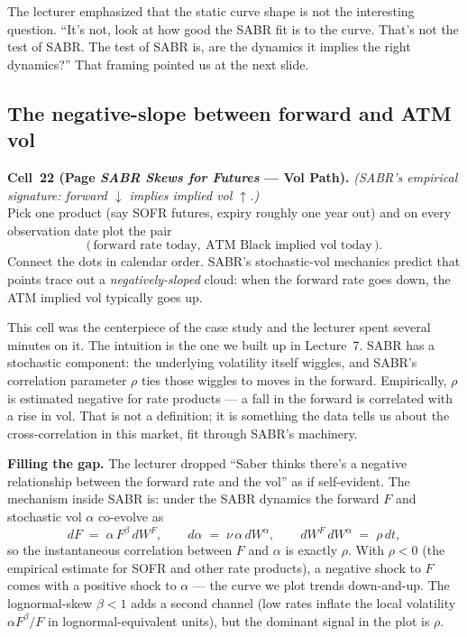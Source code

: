 The lecturer emphasized that the static curve shape is not the
interesting question. ``It's not, look at how good the SABR fit is
to the curve. That's not the test of SABR. The test of SABR is, are
the dynamics it implies the right dynamics?'' That framing pointed
us at the next slide.

\subsection{The negative-slope between forward and ATM vol}\label{L8-sec:negslope}

\begin{keyblock}
\textbf{Cell~22 (Page \emph{SABR Skews for Futures} --- Vol Path).}
\emph{(SABR's empirical signature: forward $\downarrow$ implies
implied vol $\uparrow$.)}\\
Pick one product (say SOFR futures, expiry roughly one year out) and
on every observation date plot the pair
\[
   \bigl(\,\text{forward rate today},\ \text{ATM Black implied vol today}\,\bigr).
\]
Connect the dots in calendar order. SABR's stochastic-vol mechanics
predict that points trace out a \emph{negatively-sloped} cloud:
when the forward rate goes down, the ATM implied vol typically goes
up.
\end{keyblock}

This cell was the centerpiece of the case study and the lecturer
spent several minutes on it. The intuition is the one we built up
in Lecture~7. SABR has a stochastic component: the underlying
volatility itself wiggles, and SABR's correlation parameter $\rho$
ties those wiggles to moves in the forward. Empirically, $\rho$ is
estimated negative for rate products --- a fall in the forward is
correlated with a rise in vol. That is not a definition; it is
something the data tells us about the cross-correlation in this
market, fit through SABR's machinery.

\begin{tipblock}
\textbf{Filling the gap.} The lecturer dropped ``Saber thinks there's
a negative relationship between the forward rate and the vol'' as if
self-evident. The mechanism inside SABR is: under the SABR dynamics
the forward $F$ and stochastic vol $\alpha$ co-evolve as
\[
  dF \;=\; \alpha\,F^{\beta}\,dW^{F},
  \qquad
  d\alpha \;=\; \nu\,\alpha\,dW^{\alpha},
  \qquad
  dW^{F}\,dW^{\alpha} \;=\; \rho\,dt,
\]
so the instantaneous correlation between $F$ and $\alpha$ is exactly
$\rho$. With $\rho < 0$ (the empirical estimate for SOFR and other
rate products), a negative shock to $F$ comes with a positive shock
to $\alpha$ --- the curve we plot trends down-and-up. The
lognormal-skew $\beta < 1$ adds a second channel (low rates inflate
the local volatility $\alpha F^{\beta}/F$ in lognormal-equivalent
units), but the dominant signal in the plot is $\rho$.
\end{tipblock}

